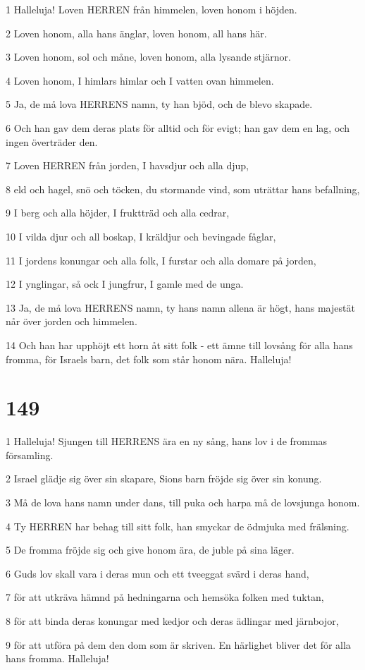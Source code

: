 \par 1 Halleluja! Loven HERREN från himmelen, loven honom i höjden.
\par 2 Loven honom, alla hans änglar, loven honom, all hans här.
\par 3 Loven honom, sol och måne, loven honom, alla lysande stjärnor.
\par 4 Loven honom, I himlars himlar och I vatten ovan himmelen.
\par 5 Ja, de må lova HERRENS namn, ty han bjöd, och de blevo skapade.
\par 6 Och han gav dem deras plats för alltid och för evigt; han gav dem en lag, och ingen överträder den.
\par 7 Loven HERREN från jorden, I havsdjur och alla djup,
\par 8 eld och hagel, snö och töcken, du stormande vind, som uträttar hans befallning,
\par 9 I berg och alla höjder, I fruktträd och alla cedrar,
\par 10 I vilda djur och all boskap, I kräldjur och bevingade fåglar,
\par 11 I jordens konungar och alla folk, I furstar och alla domare på jorden,
\par 12 I ynglingar, så ock I jungfrur, I gamle med de unga.
\par 13 Ja, de må lova HERRENS namn, ty hans namn allena är högt, hans majestät når över jorden och himmelen.
\par 14 Och han har upphöjt ett horn åt sitt folk - ett ämne till lovsång för alla hans fromma, för Israels barn, det folk som står honom nära. Halleluja!

\chapter{149}

\par 1 Halleluja! Sjungen till HERRENS ära en ny sång, hans lov i de frommas församling.
\par 2 Israel glädje sig över sin skapare, Sions barn fröjde sig över sin konung.
\par 3 Må de lova hans namn under dans, till puka och harpa må de lovsjunga honom.
\par 4 Ty HERREN har behag till sitt folk, han smyckar de ödmjuka med frälsning.
\par 5 De fromma fröjde sig och give honom ära, de juble på sina läger.
\par 6 Guds lov skall vara i deras mun och ett tveeggat svärd i deras hand,
\par 7 för att utkräva hämnd på hedningarna och hemsöka folken med tuktan,
\par 8 för att binda deras konungar med kedjor och deras ädlingar med järnbojor,
\par 9 för att utföra på dem den dom som är skriven. En härlighet bliver det för alla hans fromma. Halleluja!

